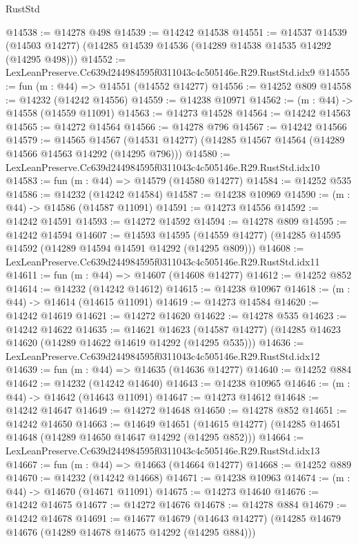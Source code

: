 \begin{lexlean}{RustStd}
\begin{coremodule}
@14538 := @14278 @498
@14539 := @14242 @14538
@14551 := @14537
    @14539
    (@14503 @14277)
    (@14285 @14539 @14536 (@14289 @14538 @14535 @14292 (@14295 @498)))
@14552 := LexLeanPreserve.Cc639d244984595f0311043c4c505146e.R29.RustStd.idx9
@14555 := fun (m : @44) => @14551 (@14552 @14277)
@14556 := @14252 @809
@14558 := @14232 (@14242 @14556)
@14559 := @14238 @10971
@14562 := (m : @44) -> @14558 (@14559 @11091)
@14563 := @14273 @14528
@14564 := @14242 @14563
@14565 := @14272 @14564
@14566 := @14278 @796
@14567 := @14242 @14566
@14579 := @14565
    @14567
    (@14531 @14277)
    (@14285 @14567 @14564 (@14289 @14566 @14563 @14292 (@14295 @796)))
@14580 := LexLeanPreserve.Cc639d244984595f0311043c4c505146e.R29.RustStd.idx10
@14583 := fun (m : @44) => @14579 (@14580 @14277)
@14584 := @14252 @535
@14586 := @14232 (@14242 @14584)
@14587 := @14238 @10969
@14590 := (m : @44) -> @14586 (@14587 @11091)
@14591 := @14273 @14556
@14592 := @14242 @14591
@14593 := @14272 @14592
@14594 := @14278 @809
@14595 := @14242 @14594
@14607 := @14593
    @14595
    (@14559 @14277)
    (@14285 @14595 @14592 (@14289 @14594 @14591 @14292 (@14295 @809)))
@14608 := LexLeanPreserve.Cc639d244984595f0311043c4c505146e.R29.RustStd.idx11
@14611 := fun (m : @44) => @14607 (@14608 @14277)
@14612 := @14252 @852
@14614 := @14232 (@14242 @14612)
@14615 := @14238 @10967
@14618 := (m : @44) -> @14614 (@14615 @11091)
@14619 := @14273 @14584
@14620 := @14242 @14619
@14621 := @14272 @14620
@14622 := @14278 @535
@14623 := @14242 @14622
@14635 := @14621
    @14623
    (@14587 @14277)
    (@14285 @14623 @14620 (@14289 @14622 @14619 @14292 (@14295 @535)))
@14636 := LexLeanPreserve.Cc639d244984595f0311043c4c505146e.R29.RustStd.idx12
@14639 := fun (m : @44) => @14635 (@14636 @14277)
@14640 := @14252 @884
@14642 := @14232 (@14242 @14640)
@14643 := @14238 @10965
@14646 := (m : @44) -> @14642 (@14643 @11091)
@14647 := @14273 @14612
@14648 := @14242 @14647
@14649 := @14272 @14648
@14650 := @14278 @852
@14651 := @14242 @14650
@14663 := @14649
    @14651
    (@14615 @14277)
    (@14285 @14651 @14648 (@14289 @14650 @14647 @14292 (@14295 @852)))
@14664 := LexLeanPreserve.Cc639d244984595f0311043c4c505146e.R29.RustStd.idx13
@14667 := fun (m : @44) => @14663 (@14664 @14277)
@14668 := @14252 @889
@14670 := @14232 (@14242 @14668)
@14671 := @14238 @10963
@14674 := (m : @44) -> @14670 (@14671 @11091)
@14675 := @14273 @14640
@14676 := @14242 @14675
@14677 := @14272 @14676
@14678 := @14278 @884
@14679 := @14242 @14678
@14691 := @14677
    @14679
    (@14643 @14277)
    (@14285 @14679 @14676 (@14289 @14678 @14675 @14292 (@14295 @884)))

\end{coremodule}
\end{lexlean}
